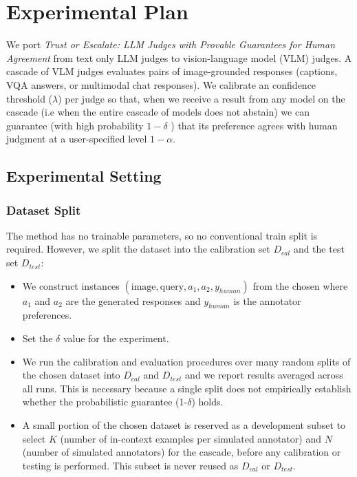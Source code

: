 \documentclass[11pt,a4paper]{article}
\begin{document}
\section{Experimental Plan}

We port \emph{Trust or Escalate: LLM Judges with Provable Guarantees for Human Agreement}
\citet{jung2025trust} from text only LLM
judges to vision-language model (VLM) judges. A cascade of VLM judges evaluates
pairs of image-grounded responses (captions, VQA answers, or multimodal chat responses). We calibrate an confidence threshold ($\lambda$) per judge so that, when we receive a result from any model on the cascade (i.e when the entire cascade of models does not abstain)  we can guarantee (with high probability $1-\delta$ ) that its preference agrees with human judgment at a user-specified level $1-\alpha$.
 
\subsection{Experimental Setting}
 
\subsubsection{Dataset Split}

The method has no trainable parameters, so no conventional train split is required. However, we split the dataset into the calibration set $D_{cal}$ and the test set $D_{test}$:
 
\begin{itemize}[leftmargin=*]
    
  \item We construct instances
        $(\text{image}, \text{query}, a_1, a_2, y_{human})$ from the chosen  where $a_1$ and $a_2$ are the generated responses and $y_{human}$ is the annotator preferences.
  \item Set the $\delta$ value for the experiment.
  \item We run the calibration and evaluation procedures over many random splits of the chosen
        dataset into $D_{cal}$ and $D_{test}$ and we report results averaged across all runs. This is necessary because a
        single split does not empirically establish whether the probabilistic guarantee (1-$\delta$)  holds.
  \item A small portion of the chosen dataset is reserved as a development subset to select $K$ (number of in-context
        examples per simulated annotator) and $N$ (number of simulated annotators) for the cascade, before any calibration or testing is performed. This subset is never
        reused as $D_{cal}$ or $D_{test}$.
\end{itemize}
 
\end{document}
